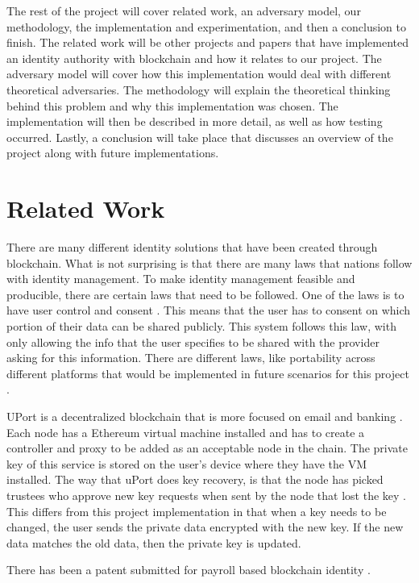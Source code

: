 \documentclass[letterpaper, 10 pt, conference]{ieeeconf}  %
\begin{document}
The rest of the project will cover related work, an adversary model, our methodology, the implementation and experimentation, and then a conclusion to finish. The related work will be other projects and papers that have implemented an identity authority with blockchain and how it relates to our project. The adversary model will cover how this implementation would deal with different theoretical adversaries. The methodology will explain the theoretical thinking behind this problem and why this implementation was chosen. The implementation will then be described in more detail, as well as how testing occurred. Lastly, a conclusion will take place that discusses an overview of the project along with future implementations.

\section{Related Work}

There are many different identity solutions that have been created through blockchain. What is not surprising is that there are many laws that nations follow with identity management. To make identity management feasible and producible, there are certain laws that need to be followed. One of the laws is to have user control and consent \cite{1}. This means that the user has to consent on which portion of their data can be shared publicly. This system follows this law, with only allowing the info that the user specifies to be shared with the provider asking for this information. There are different laws, like portability across different platforms that would be implemented in future scenarios for this project \cite{1}.

UPort is a decentralized blockchain that is more focused on email and banking \cite{1}. Each node has a Ethereum virtual machine installed and has to create a controller and proxy to be added as an acceptable node in the chain. The private key of this service is stored on the user's device where they have the VM installed. The way that uPort does key recovery, is that the node has picked trustees who approve new key requests when sent by the node that lost the key \cite{1}. This differs from this project implementation in that when a key needs to be changed, the user sends the private data encrypted with the new key. If the new data matches the old data, then the private key is updated.

There has been a patent submitted for payroll based blockchain identity \cite{2}.
\end{document}
